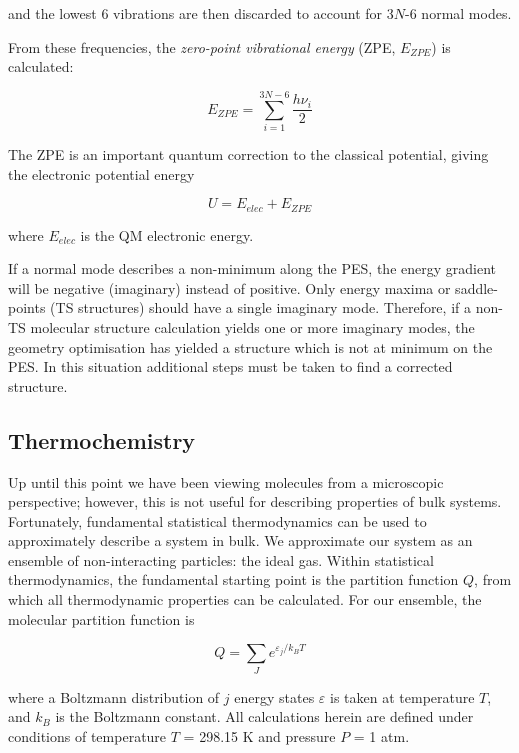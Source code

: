 \noindent and the lowest 6 vibrations are then discarded to account for 3$N$-6
normal modes.

From these frequencies, the \emph{zero-point vibrational energy} (ZPE, $E_{ZPE}$) is
calculated:

\begin{equation}
  E_{ZPE} = \sum_{i=1}^{3N-6} \frac{h\nu_i}{2}
\end{equation}

\noindent The ZPE is an important quantum correction to the classical potential,
giving the electronic potential energy

\begin{equation}
U = E_{elec} + E_{ZPE}
\end{equation}

\noindent where $E_{elec}$ is the QM electronic energy.

If a normal mode describes a non-minimum along the PES, the energy gradient will
be negative (imaginary) instead of positive. Only energy maxima or saddle-points
(TS structures) should have a single imaginary mode. Therefore, if a non-TS
molecular structure calculation yields one or more imaginary modes, the geometry
optimisation has yielded a structure which is not at minimum on the PES. In this
situation additional steps must be taken to find a corrected structure.

\subsection{Thermochemistry}

Up until this point we have been viewing molecules from a microscopic
perspective; however, this is not useful for describing properties of bulk
systems. Fortunately, fundamental statistical thermodynamics can be used to
approximately describe a system in bulk.\cite{McQuarrie1999,McQuarrie2000} We
approximate our system as an ensemble of non-interacting particles: the ideal
gas. Within statistical thermodynamics, the fundamental starting point is the
partition function $Q$,\cite{note4} from which all thermodynamic properties can
be calculated. For our ensemble, the molecular partition function is

\begin{equation}
  Q = \sum_J e^{\varepsilon_j/k_BT}
\end{equation}

\noindent where a Boltzmann distribution of $j$ energy states $\varepsilon$ is
taken at temperature $T$, and $k_B$ is the Boltzmann constant. All calculations
herein are defined under conditions of temperature $T$ = 298.15 K and pressure
$P$ = 1 atm.

